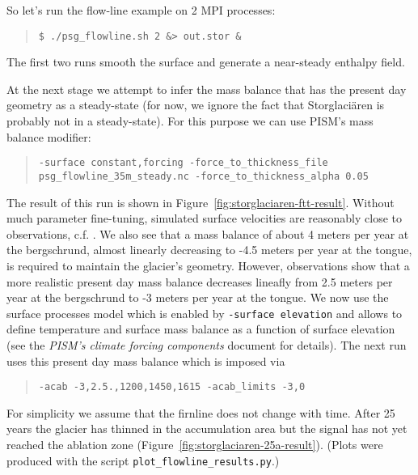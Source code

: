 So let's run the flow-line example on 2 MPI processes:
\begin{quote}\small
\begin{verbatim}
$ ./psg_flowline.sh 2 &> out.stor &
\end{verbatim}
\normalsize\end{quote}

The first two runs smooth the surface and generate a near-steady enthalpy field.

At the next stage we attempt to infer the mass balance that has the present day geometry as a steady-state (for now, we ignore the fact that Storglaci{\"a}ren is probably not in a steady-state).  For this purpose we can use PISM's mass balance modifier:
\begin{quote}\small
\begin{verbatim}
-surface constant,forcing -force_to_thickness_file psg_flowline_35m_steady.nc -force_to_thickness_alpha 0.05
\end{verbatim}
\normalsize\end{quote}
The result of this run is shown in Figure~\ref{fig:storglaciaren-ftt-result}. Without much parameter fine-tuning, simulated surface velocities are reasonably close to observations, c.f. \cite{AschwandenBlatter}.  We also see that a mass balance of about 4 meters per year at the bergschrund, almost linearly decreasing to -4.5 meters per year at the tongue, is required to maintain the glacier's geometry.  However, observations show that a more realistic present day mass balance decreases lineafly from 2.5 meters per year at the bergschrund to -3 meters per year at the tongue.  We now use the surface processes model which is enabled by \texttt{-surface elevation} and allows to define temperature and surface mass balance as a function of surface elevation (see the \emph{PISM's climate forcing components} document for details).  The next run uses this present day mass balance which is imposed via 
\begin{quote}\small
\begin{verbatim}
-acab -3,2.5.,1200,1450,1615 -acab_limits -3,0
\end{verbatim}
\normalsize\end{quote} 
For simplicity we assume that the firnline does not change with time. After 25 years the glacier has thinned in the accumulation area but the signal has not yet reached the ablation zone (Figure~\ref{fig:storglaciaren-25a-result}). (Plots were produced with the script \texttt{plot_flowline_results.py}.)

